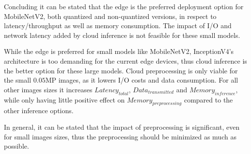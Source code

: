 Concluding it can be stated that the edge is the preferred deployment option for MobileNetV2, both quantized and non-quantized versions, in respect to latency/throughput as well as memory consumption.
The impact of I/O and network latency added by cloud inference is not feasible for these small models.

While the edge is preferred for small models like MobileNetV2, InceptionV4's architecture is too demanding for the current edge devices, thus cloud inference is the better option for these large models.
Cloud preprocessing is only viable for the small $0.05$MP images, as it lowers I/O costs and data consumption. For all other images sizes it increases $Latency_{total}$, $Data_{transmitted}$ and $Memory_{inference}$, while only having little positive effect on $Memory_{preprocessing}$ compared to the other inference options.

In general, it can be stated that the impact of preprocessing is significant, even for small images sizes, thus the preprocessing should be minimized as much as possible.

\FloatBarrier
